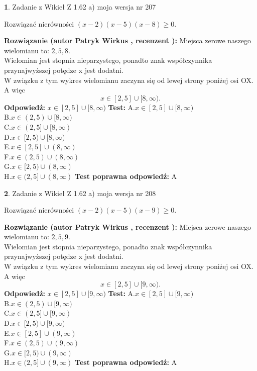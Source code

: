 \documentclass[12pt, a4paper]{article}
\theoremstyle{definition} %
\newtheorem{zad}{}
\newcommand{\zadStart}[1]{\begin{zad}#1\newline}
\newcommand{\zadStop}{\end{zad}}
\newcommand{\rozwStart}[2]{\noindent \textbf{Rozwiązanie (autor #1 , recenzent #2): }\newline}
\newcommand{\rozwStop}{\newline}
\newcommand{\odpStart}{\noindent \textbf{Odpowiedź:}\newline}
\newcommand{\odpStop}{\newline}
\newcommand{\testStart}{\noindent \textbf{Test:}\newline}
\newcommand{\testStop}{\newline}
\newcommand{\kluczStart}{\noindent \textbf{Test poprawna odpowiedź:}\newline}
\newcommand{\kluczStop}{\newline}
\begin{document}
\zadStart{Zadanie z Wikieł Z 1.62 a) moja wersja nr 207}

Rozwiązać nierówności $(x-2)(x-5)(x-8)\ge0$.
\zadStop
\rozwStart{Patryk Wirkus}{}
Miejsca zerowe naszego wielomianu to: $2, 5, 8$.\\
Wielomian jest stopnia nieparzystego, ponadto znak współczynnika przy\linebreak najwyższej potędze x jest dodatni.\\ W związku z tym wykres wielomianu zaczyna się od lewej strony poniżej osi OX. A więc $$x \in [2,5] \cup [8,\infty).$$
\rozwStop
\odpStart
$x \in [2,5] \cup [8,\infty)$
\odpStop
\testStart
A.$x \in [2,5] \cup [8,\infty)$\\
B.$x \in (2,5) \cup [8,\infty)$\\
C.$x \in (2,5] \cup [8,\infty)$\\
D.$x \in [2,5) \cup [8,\infty)$\\
E.$x \in [2,5] \cup (8,\infty)$\\
F.$x \in (2,5) \cup (8,\infty)$\\
G.$x \in [2,5) \cup (8,\infty)$\\
H.$x \in (2,5] \cup (8,\infty)$
\testStop
\kluczStart
A
\kluczStop



\zadStart{Zadanie z Wikieł Z 1.62 a) moja wersja nr 208}

Rozwiązać nierówności $(x-2)(x-5)(x-9)\ge0$.
\zadStop
\rozwStart{Patryk Wirkus}{}
Miejsca zerowe naszego wielomianu to: $2, 5, 9$.\\
Wielomian jest stopnia nieparzystego, ponadto znak współczynnika przy\linebreak najwyższej potędze x jest dodatni.\\ W związku z tym wykres wielomianu zaczyna się od lewej strony poniżej osi OX. A więc $$x \in [2,5] \cup [9,\infty).$$
\rozwStop
\odpStart
$x \in [2,5] \cup [9,\infty)$
\odpStop
\testStart
A.$x \in [2,5] \cup [9,\infty)$\\
B.$x \in (2,5) \cup [9,\infty)$\\
C.$x \in (2,5] \cup [9,\infty)$\\
D.$x \in [2,5) \cup [9,\infty)$\\
E.$x \in [2,5] \cup (9,\infty)$\\
F.$x \in (2,5) \cup (9,\infty)$\\
G.$x \in [2,5) \cup (9,\infty)$\\
H.$x \in (2,5] \cup (9,\infty)$
\testStop
\kluczStart
A
\kluczStop
\end{document}
